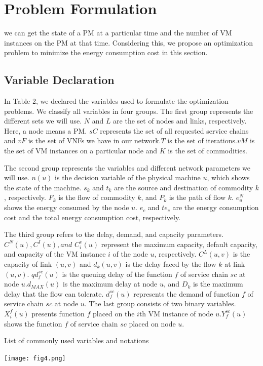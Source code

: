 \documentclass[12pt]{article}
\begin{document}
\section{Problem Formulation}

 we can get the state of
a PM at a particular time and the number of VM instances on
the PM at that time. Considering this, we propose an
optimization problem to minimize the energy consumption
cost in this section.
\subsection{Variable Declaration}
In Table 2, we declared the variables used to formulate the
optimization problems. We classify all variables in four
groups. The first group represents the different sets we will
use. $N$ and  $L$ are the set of nodes and links, respectively.
Here, a node means a PM. $sC$ represents the set of all
requested service chains and $vF$ is the set of VNFs we have in
our network.$T$  is the set of iterations.$vM$  is the set of VM
instances on a particular node and $K$ is the set of commodities.

The second group represents the variables and different
network parameters we will use. $n(u)$ is the decision variable
of the physical machine $u$, which shows the state of the
machine. $s_k$ and $t_k$ are the source and destination of
commodity $k$, respectively. $F_k$ is the flow of commodity $k$,
and $P_k$ is the path of flow $k$. $e_u^N$ shows the energy consumed
by the node $u$. $e_c$ and $te_c$ are the energy consumption cost and
the total energy consumption cost, respectively. 

The third
group refers to the delay, demand, and capacity parameters.
$C^N(u), C^I(u), and$  $C_i^v(u)$ represent the maximum capacity,
default capacity, and capacity of the VM instance $i$ of the node
$u$, respectively. $C^L(u,v)$ is the capacity of link $(u,v)$ and
$d_k(u,v)$ is the delay faced by the flow $k$ at link $(u,v)$.
$qd_f^{sc}(u)$ is the queuing delay of the function $f$ of service
chain $sc$ at node $u.d_{MAX}(u)$  is the maximum delay at node $u$,
and $D_k$ is the maximum delay that the flow can tolerate.
$d_f^{sc}(u)$ represents the demand of function $f$ of service chain $sc$
at node $u$. The last group consists of two binary variables.
$X_i^f(u)$ presents function $f$ placed on the $i$th VM instance of
node $u$.$Y_f^{sc}(u)$ shows the function $f$ of service chain $sc$
placed on node $u$.

\begin{table}[t!]
\caption{List of commonly used variables and notations}
  \texttt{[image: fig4.png]}
\centering
\label{table:2}
\end{table}
\end{document}

